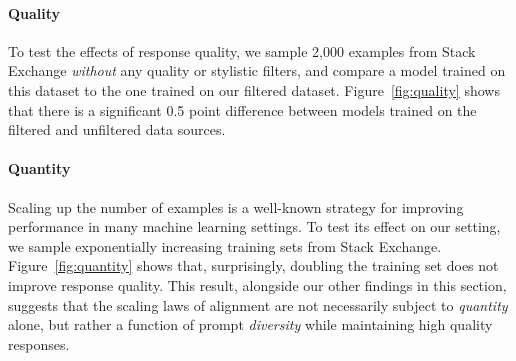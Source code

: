 \paragraph{Quality}
To test the effects of response quality, we sample 2,000 examples from Stack Exchange \textit{without} any quality or stylistic filters, and compare a model trained on this dataset to the one trained on our filtered dataset.
Figure~\ref{fig:quality} shows that there is a significant 0.5 point difference between models trained on the filtered and unfiltered data sources.

\paragraph{Quantity}
Scaling up the number of examples is a well-known strategy for improving performance in many machine learning settings.
To test its effect on our setting, we sample exponentially increasing training sets from Stack Exchange.
Figure~\ref{fig:quantity} shows that, surprisingly, doubling the training set does not improve response quality.
This result, alongside our other findings in this section, suggests that the scaling laws of alignment are not necessarily subject to \textit{quantity} alone, but rather a function of prompt \textit{diversity} while maintaining high quality responses.
